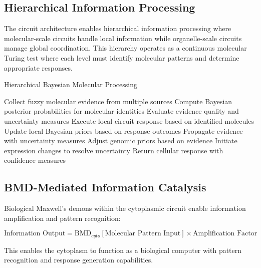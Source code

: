 \documentclass[12pt,a4paper]{article}
\begin{document}
\subsection{Hierarchical Information Processing}

The circuit architecture enables hierarchical information processing where molecular-scale circuits handle local information while organelle-scale circuits manage global coordination. This hierarchy operates as a continuous molecular Turing test where each level must identify molecular patterns and determine appropriate responses.

\begin{algorithm}
\caption{Hierarchical Bayesian Molecular Processing}
\begin{algorithmic}
    \State Collect fuzzy molecular evidence from multiple sources
    \State Compute Bayesian posterior probabilities for molecular identities
    \State Evaluate evidence quality and uncertainty measures
        \State Execute local circuit response based on identified molecules
        \State Update local Bayesian priors based on response outcomes
    \Else
            \State Propagate evidence with uncertainty measures
            \State {}
        \EndFor
            \State Adjust genomic priors based on evidence
            \State Initiate expression changes to resolve uncertainty
        \EndIf
    \EndIf
    \State Return cellular response with confidence measures
\EndProcedure
\end{algorithmic}
\end{algorithm}

\subsection{BMD-Mediated Information Catalysis}

Biological Maxwell's demons within the cytoplasmic circuit enable information amplification and pattern recognition:

\begin{equation}
\text{Information Output} = \text{BMD}_{cyto}[\text{Molecular Pattern Input}] \times \text{Amplification Factor}
\end{equation}

This enables the cytoplasm to function as a biological computer with pattern recognition and response generation capabilities.
\end{document}
